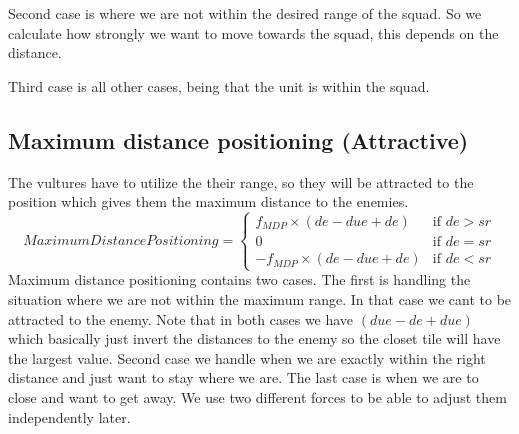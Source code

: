 		Second case  is where we are not within the desired range of the squad. So we calculate how strongly we want to move towards the squad, this depends on the distance. 
		
		Third case is all other cases, being that the unit is within the squad.
					
	\subsection*{Maximum distance positioning (Attractive)}
		The vultures have to utilize the their range, so they will be attracted to the position which gives them the maximum distance 
		to the enemies.
		\begin{displaymath}
			MaximumDistancePositioning = \begin{cases}
					f_{MDP} \times (de - due + de) & \text{if } de > sr\\
					0 & \text{if } de = sr\\
					-f_{MDP} \times (de - due + de) & \text{if } de < sr
				\end{cases}		
		\end{displaymath}
		Maximum distance positioning contains two cases. The first is handling the situation where we are not within the maximum range. In that case we cant to be attracted to the enemy. Note that in both cases we have $(due - de + due)$ which basically just invert the distances to the enemy so the closet tile will have the largest value.
		Second case we handle when we are exactly within the right distance and just want to stay where we are.
		The last case is when we are to close and want to get away.
		We use two different forces to be able to adjust them independently later.
		
		
		
